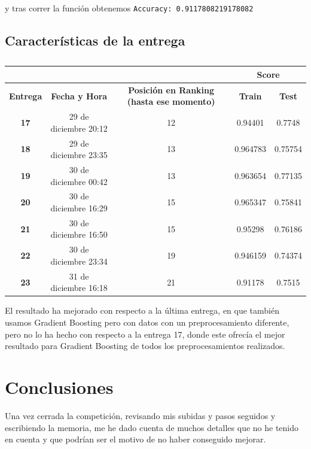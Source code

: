 \documentclass[a4paper,11pt]{article}
\begin{document}
  y tras correr la función  obtenemos \texttt{Accuracy:  0.9117808219178082}
  \newpage
  \subsection{Características de la entrega}
  
  \begin{table}[htbp]
  	\caption{}\begin{center}
  	\begin{tabular}{|c|c|c|c|c|}
  		\hline
  		\multicolumn{1}{|l|}{\textbf{}} & \textbf{} & \textbf{} & \multicolumn{ 2}{c|}{\textbf{Score}} \\ \hline
  		\textbf{Entrega} & \textbf{Fecha y Hora} & \textbf{Posición en Ranking (hasta ese momento)} & \textbf{Train} & \textbf{Test} \\ \hline
  		\textbf{17} & 29 de diciembre 20:12 & 12 & 0.94401 & 0.7748 \\ \hline
  		\textbf{18} & 29 de diciembre 23:35  & 13 & 0.964783 & 0.75754 \\ \hline
  		\textbf{19} & 30 de diciembre 00:42  & 13 & 0.963654 & 0.77135 \\ \hline
  		\textbf{20} & 30 de diciembre 16:29  & 15 & 0.965347 & 0.75841 \\ \hline
  		\textbf{21} & 30 de diciembre 16:50 & 15 & 0.95298 & 0.76186 \\ \hline
  		\textbf{22} & 30 de diciembre 23:34 & 19 & 0.946159 & 0.74374 \\ \hline
  		\textbf{23} & 31 de diciembre 16:18 & 21 & 0.91178 & 0.7515 \\ \hline
  	\end{tabular}\end{center}
  	\label{}
  \end{table}

El resultado ha mejorado con respecto a la última entrega, en que también usamos Gradient Boosting pero con datos con un preprocesamiento diferente, pero no lo ha hecho con respecto a la entrega 17, donde este ofrecía el mejor resultado para Gradient Boosting de todos los preprocesamientos realizados. 
  \section{Conclusiones}
Una vez cerrada la competición, revisando mis subidas y pasos seguidos y escribiendo la memoria, me he dado cuenta de muchos detalles que no he tenido en cuenta y que podrían ser el motivo de no haber conseguido mejorar. 
\end{document}
